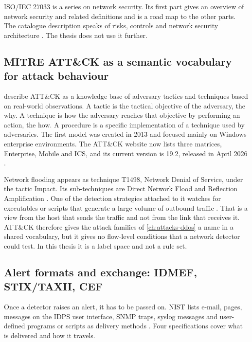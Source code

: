 ISO/IEC 27033 is a series on network security. Its first part gives an
overview of network security and related definitions and is a road map to
the other parts. The catalogue description speaks of risks, controls and
network security architecture \citep{iso2015iec27033}. The thesis does not
use it further.

\subsection{MITRE ATT\&CK as a semantic vocabulary for attack behaviour}
\label{sec:mitre-attack-vocabulary}

\citet{strom2020attack} describe ATT\&CK as a knowledge base of adversary
tactics and techniques based on real-world observations. A tactic is the
tactical objective of the adversary, the why. A technique is how the
adversary reaches that objective by performing an action, the how. A
procedure is a specific implementation of a technique used by adversaries.
The first model was created in 2013 and focused mainly on Windows
enterprise environments. The ATT\&CK website now lists three matrices,
Enterprise, Mobile and ICS, and its current version is 19.2, released in
April 2026 \citep{mitre2026attackversions}.

Network flooding appears as technique T1498, Network Denial of Service,
under the tactic Impact. Its sub-techniques are Direct Network Flood and
Reflection Amplification \citep{mitre2025t1498}. One of the detection
strategies attached to it watches for executables or scripts that generate
a large volume of outbound traffic \citep{mitre2025t1498}. That is a view
from the host that sends the traffic and not from the link that receives it.
ATT\&CK therefore gives the attack families of \cref{ch:attacks-ddos} a name
in a shared vocabulary, but it gives no flow-level conditions that a network
detector could test. In this thesis it is a label space and not a rule set.

\subsection{Alert formats and exchange: IDMEF, STIX/\allowbreak TAXII, CEF}
\label{sec:alert-formats}

Once a detector raises an alert, it has to be passed on. NIST lists e-mail,
pages, messages on the IDPS user interface, SNMP traps, syslog messages and
user-defined programs or scripts as delivery methods
\citep{scarfone2007nist80094}. Four specifications cover what is delivered
and how it travels.


